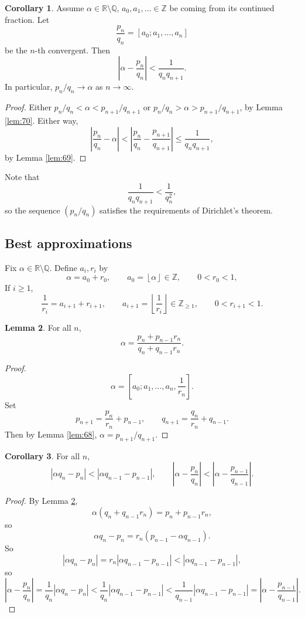 \documentclass{article}
\newcommand{\Z}{\mathbb{Z}}
\newcommand{\Q}{\mathbb{Q}}
\newcommand{\R}{\mathbb{R}}
\newcommand{\rb}[1]{\left( #1 \right)}
\renewcommand{\sb}[1]{\left[ #1 \right]}
\newcommand{\abs}[1]{\left\lvert #1 \right\rvert}
\newcommand{\fb}[1]{\left\lfloor #1 \right\rfloor}
\theoremstyle{definition}\newtheorem{definition}{Definition}
\theoremstyle{definition}\newtheorem{remark}[definition]{Remark}
\theoremstyle{definition}\newtheorem*{example}{Example}
\theoremstyle{definition}\newtheorem*{note}{Note}
\newtheorem{lemma}[definition]{Lemma}
\newtheorem{corollary}[definition]{Corollary}
\begin{document}
\begin{corollary}
Assume $ \alpha \in \R \setminus \Q $, $ a_0, a_1, \dots \in \Z $ be coming from its continued fraction. Let
$$ \dfrac{p_n}{q_n} = \sb{a_0; a_1, \dots, a_n} $$
be the $ n $-th convergent. Then
$$ \abs{\alpha - \dfrac{p_n}{q_n}} < \dfrac{1}{q_nq_{n + 1}}. $$
In particular, $ p_n / q_n \to \alpha $ as $ n \to \infty $.
\end{corollary}

\begin{proof}
Either $ p_n / q_n < \alpha < p_{n + 1} / q_{n + 1} $ or $ p_n / q_n > \alpha > p_{n + 1} / q_{n + 1} $, by Lemma \ref{lem:70}. Either way,
$$ \abs{\dfrac{p_n}{q_n} - \alpha} < \abs{\dfrac{p_n}{q_n} - \dfrac{p_{n + 1}}{q_{n + 1}}} \le \dfrac{1}{q_nq_{n + 1}}, $$
by Lemma \ref{lem:69}.
\end{proof}

Note that
$$ \dfrac{1}{q_nq_{n + 1}} < \dfrac{1}{q_n^2}, $$
so the sequence $ \rb{p_n / q_n} $ satisfies the requirements of Dirichlet's theorem.

\subsection{Best approximations}

Fix $ \alpha \in \R \setminus \Q $. Define $ a_i, r_i $ by
$$ \alpha = a_0 + r_0, \qquad a_0 = \fb{\alpha} \in \Z, \qquad 0 < r_0 < 1, $$
If $ i \ge 1 $,
$$ \dfrac{1}{r_i} = a_{i + 1} + r_{i + 1}, \qquad a_{i + 1} = \fb{\dfrac{1}{r_i}} \in \Z_{\ge 1}, \qquad 0 < r_{i + 1} < 1. $$

\begin{lemma}
\label{lem:72}
For all $ n $,
$$ \alpha = \dfrac{p_n + p_{n - 1}r_n}{q_n + q_{n - 1}r_n}. $$
\end{lemma}

\begin{proof}
$$ \alpha = \sb{a_0; a_1, \dots, a_n, \dfrac{1}{r_n}}. $$
Set
$$ p_{n + 1} = \dfrac{p_n}{r_n} + p_{n - 1}, \qquad q_{n + 1} = \dfrac{q_n}{r_n} + q_{n - 1}. $$
Then by Lemma \ref{lem:68}, $ \alpha = p_{n + 1} / q_{n + 1} $.
\end{proof}

\begin{corollary}
For all $ n $,
$$ \abs{\alpha q_n - p_n} < \abs{\alpha q_{n - 1} - p_{n - 1}}, \qquad \abs{\alpha - \dfrac{p_n}{q_n}} < \abs{\alpha - \dfrac{p_{n - 1}}{q_{n - 1}}}. $$
\end{corollary}

\begin{proof}
By Lemma \ref{lem:72},
$$ \alpha\rb{q_n + q_{n - 1}r_n} = p_n + p_{n - 1}r_n, $$
so
$$ \alpha q_n - p_n = r_n\rb{p_{n - 1} - \alpha q_{n - 1}}. $$
So
$$ \abs{\alpha q_n - p_n} = r_n\abs{\alpha q_{n - 1} - p_{n - 1}} < \abs{\alpha q_{n - 1} - p_{n - 1}}, $$
so
$$ \abs{\alpha - \dfrac{p_n}{q_n}} = \dfrac{1}{q_n}\abs{\alpha q_n - p_n} < \dfrac{1}{q_n}\abs{\alpha q_{n - 1} - p_{n - 1}} < \dfrac{1}{q_{n - 1}}\abs{\alpha q_{n - 1} - p_{n - 1}} = \abs{\alpha - \dfrac{p_{n - 1}}{q_{n - 1}}}. $$
\end{proof}
\end{document}
